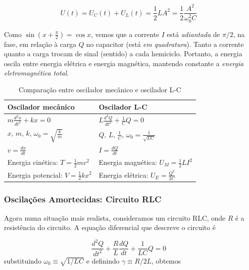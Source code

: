 \documentclass{article}
\begin{document}
\begin{equation}
    \boxed{U(t) = U_C(t) + U_L(t) = \frac{1}{2}LA^2 = \frac{1}{2}\frac{A^2}{\omega_0^2 C}}
\end{equation}

Como \(\sin(x + \frac{\pi}{2}) = \cos x\), vemos que a corrente \(I\) está \emph{adiantada} de \(\pi/2\), na fase, em relação à carga \(Q\) no capacitor (está \emph{em quadratura}). Tanto a corrente quanto a carga trocam de sinal (sentido) a cada hemiciclo. Portanto, a energia oscila entre energia elétrica e energia magnética, mantendo constante a \emph{energia eletromagnética total}.

\begin{table}[h]
    \centering
    \caption{Comparação entre oscilador mecânico e oscilador L-C}
    \label{tab:osciladores}
    \begin{tabular}{l l}
    \toprule
    \textbf{Oscilador mecânico} & \textbf{Oscilador L-C} \\
    \midrule
    $\displaystyle m \frac{d^2 x}{dt^2} + kx = 0$ & $\displaystyle L \frac{d^2 Q}{dt^2} + \frac{1}{C} Q = 0$ \\
    $\displaystyle x, \, m, \, k, \, \omega_0 = \sqrt{\frac{k}{m}}$ & $\displaystyle Q, \, L, \, \frac{1}{C}, \, \omega_0 = \frac{1}{\sqrt{LC}}$ \\
    $\displaystyle v = \frac{dx}{dt}$ & $\displaystyle I = \frac{dQ}{dt}$ \\
    Energia cinética: $\displaystyle T = \frac{1}{2} mv^2$ & Energia magnética: $\displaystyle U_M = \frac{1}{2} LI^2$ \\
    Energia potencial: $\displaystyle V = \frac{1}{2} kx^2$ & Energia elétrica: $\displaystyle U_E = \frac{Q^2}{2C}$ \\
    \bottomrule
    \end{tabular}
\end{table}

\subsubsection{Oscilações Amortecidas: Circuito RLC}

Agora numa situação mais realista, consideramos um circuito RLC, onde \(R\) é a resistência do circuito. A equação diferencial que descreve o circuito é

\begin{equation}
    \frac{d^2Q}{dt^2} + \frac{R}{L} \frac{dQ}{dt} + \frac{1}{LC} Q = 0
\end{equation} substituindo \(\omega_0 \equiv \sqrt{1/LC}\) e definindo \(\gamma \equiv R/2L\), obtemos
\end{document}
